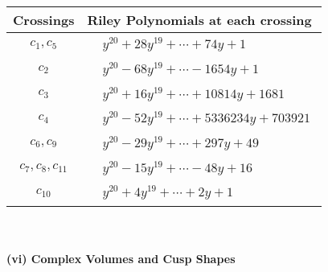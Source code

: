 \documentclass[1p]{elsarticle_modified}
\theoremstyle{definition}
\begin{document}
\begin{tabular}{m{50pt}|m{274pt}}
Crossings & \hspace{64pt}Riley Polynomials at each crossing \\
\hline $$\begin{aligned}c_{1},c_{5}\end{aligned}$$&$\begin{aligned}
&y^{20}+28 y^{19}+\cdots+74 y+1
\end{aligned}$\\
\hline $$\begin{aligned}c_{2}\end{aligned}$$&$\begin{aligned}
&y^{20}-68 y^{19}+\cdots-1654 y+1
\end{aligned}$\\
\hline $$\begin{aligned}c_{3}\end{aligned}$$&$\begin{aligned}
&y^{20}+16 y^{19}+\cdots+10814 y+1681
\end{aligned}$\\
\hline $$\begin{aligned}c_{4}\end{aligned}$$&$\begin{aligned}
&y^{20}-52 y^{19}+\cdots+5336234 y+703921
\end{aligned}$\\
\hline $$\begin{aligned}c_{6},c_{9}\end{aligned}$$&$\begin{aligned}
&y^{20}-29 y^{19}+\cdots+297 y+49
\end{aligned}$\\
\hline $$\begin{aligned}c_{7},c_{8},c_{11}\end{aligned}$$&$\begin{aligned}
&y^{20}-15 y^{19}+\cdots-48 y+16
\end{aligned}$\\
\hline $$\begin{aligned}c_{10}\end{aligned}$$&$\begin{aligned}
&y^{20}+4 y^{19}+\cdots+2 y+1
\end{aligned}$\\
\hline
\end{tabular}\\~\\
\newpage\flushleft \textbf{(vi) Complex Volumes and Cusp Shapes}
\end{document}

